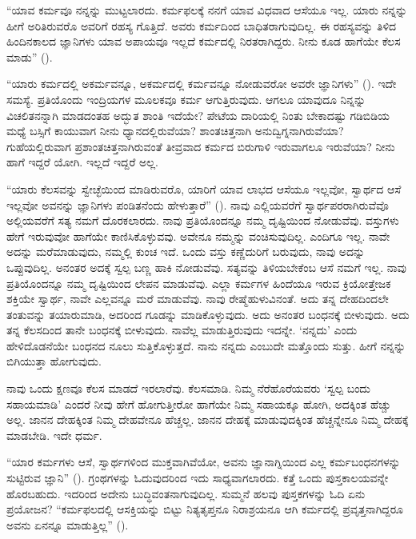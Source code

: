 “ಯಾವ ಕರ್ಮವೂ ನನ್ನನ್ನು ಮುಟ್ಟಲಾರದು. ಕರ್ಮಫಲಕ್ಕೆ ನನಗೆ ಯಾವ ವಿಧವಾದ ಆಸೆಯೂ ಇಲ್ಲ. ಯಾರು ನನ್ನನ್ನು ಹೀಗೆ ಅರಿತಿರುವರೊ ಅವರಿಗೆ ರಹಸ್ಯ ಗೊತ್ತಿದೆ. ಅವರು ಕರ್ಮದಿಂದ ಬಾಧಿತರಾಗುವುದಿಲ್ಲ. ಈ ರಹಸ್ಯವನ್ನು ತಿಳಿದ ಹಿಂದಿನಕಾಲದ ಜ್ಞಾನಿಗಳು ಯಾವ ಅಪಾಯವೂ ಇಲ್ಲದೆ ಕರ್ಮದಲ್ಲಿ ನಿರತರಾಗಿದ್ದರು. ನೀನು ಕೂಡ ಹಾಗೆಯೇ ಕೆಲಸ ಮಾಡು” ().

“ಯಾರು ಕರ್ಮದಲ್ಲಿ ಅಕರ್ಮವನ್ನೂ, ಅಕರ್ಮದಲ್ಲಿ ಕರ್ಮವನ್ನೂ ನೋಡುವರೋ ಅವರೇ ಜ್ಞಾನಿಗಳು” (). ಇದೇ ಸಮಸ್ಯೆ. ಪ್ರತಿಯೊಂದು ಇಂದ್ರಿಯಗಳ ಮೂಲಕವೂ ಕರ್ಮ ಆಗುತ್ತಿರುವುದು. ಆಗಲೂ ಯಾವುದೂ ನಿನ್ನನ್ನು ವಿಚಲಿತನನ್ನಾಗಿ ಮಾಡದಂತಹ ಅದ್ಭುತ ಶಾಂತಿ ಇದೆಯೇ? ಪೇಟೆಯ ದಾರಿಯಲ್ಲಿ ನಿಂತು ಬೇಕಾದಷ್ಟು ಗಡಿಬಿಡಿಯ ಮಧ್ಯೆ ಬಸ್ಸಿಗೆ ಕಾಯುವಾಗ ನೀನು ಧ್ಯಾನದಲ್ಲಿರುವೆಯಾ? ಶಾಂತಚಿತ್ತನಾಗಿ ಅನುದ್ವಿಗ್ನನಾಗಿರುವೆಯಾ? ಗುಹೆಯಲ್ಲಿರುವಾಗ ಪ್ರಶಾಂತಚಿತ್ತನಾಗಿರುವಂತೆ ತೀವ್ರವಾದ ಕರ್ಮದ ಬಿರುಗಾಳಿ ಇರುವಾಗಲೂ ಇರುವೆಯಾ? ನೀನು ಹಾಗೆ ಇದ್ದರೆ ಯೋಗಿ. ಇಲ್ಲದೆ ಇದ್ದರೆ ಅಲ್ಲ.

“ಯಾರು ಕೆಲಸವನ್ನು ಸ್ವೇಚ್ಛೆಯಿಂದ ಮಾಡಿರುವರೊ, ಯಾರಿಗೆ ಯಾವ ಲಾಭದ ಆಸೆಯೂ ಇಲ್ಲವೋ, ಸ್ವಾರ್ಥದ ಆಸೆ ಇಲ್ಲವೋ ಅವನನ್ನು ಜ್ಞಾನಿಗಳು ಪಂಡಿತನೆಂದು ಹೇಳುತ್ತಾರೆ” (). ನಾವು ಎಲ್ಲಿಯವರೆಗೆ ಸ್ವಾರ್ಥಪರರಾಗಿರುವೆವೊ ಅಲ್ಲಿಯವರೆಗೆ ಸತ್ಯ ನಮಗೆ ದೊರಕಲಾರದು. ನಾವು ಪ್ರತಿಯೊಂದನ್ನೂ ನಮ್ಮ ದೃಷ್ಟಿಯಿಂದ ನೋಡುವೆವು. ವಸ್ತುಗಳು ಹೇಗೆ ಇರುವುವೋ ಹಾಗೆಯೇ ಕಾಣಿಸಿಕೊಳ್ಳುವವು. ಅವೇನೂ ನಮ್ಮನ್ನು ವಂಚಿಸುವುದಿಲ್ಲ. ಎಂದಿಗೂ ಇಲ್ಲ. ನಾವೇ ಅದನ್ನು ಮರೆಮಾಡುವುದು, ನಮ್ಮಲ್ಲಿ ಕುಂಚ ಇದೆ. ಒಂದು ವಸ್ತು ಕಣ್ಣೆದುರಿಗೆ ಬರುವುದು, ನಾವು ಅದನ್ನು ಒಪ್ಪುವುದಿಲ್ಲ. ಅನಂತರ ಅದಕ್ಕೆ ಸ್ವಲ್ಪ ಬಣ್ಣ ಹಾಕಿ ನೋಡುವೆವು. ಸತ್ಯವನ್ನು ತಿಳಿಯಬೇಕೆಂಬ ಆಸೆ ನಮಗೆ ಇಲ್ಲ. ನಾವು ಪ್ರತಿಯೊಂದನ್ನೂ ನಮ್ಮ ದೃಷ್ಟಿಯಿಂದ ಲೇಪನ ಮಾಡುವೆವು. ಎಲ್ಲಾ ಕರ್ಮಗಳ ಹಿಂದೆಯೂ ಇರುವ ಕ್ರಿಯೋತ್ತೇಜಕ ಶಕ್ತಿಯೇ ಸ್ವಾರ್ಥ, ನಾವೇ ಎಲ್ಲವನ್ನೂ ಮರೆ ಮಾಡುವೆವು. ನಾವು ರೇಷ್ಮೆಹುಳುವಿನಂತೆ. ಅದು ತನ್ನ ದೇಹದಿಂದಲೇ ತಂತುವನ್ನು ತಯಾರುಮಾಡಿ, ಅದರಿಂದ ಗೂಡನ್ನು ಮಾಡಿಕೊಳ್ಳುವುದು. ಅದು ಅನಂತರ ಬಂಧನಕ್ಕೆ ಬೀಳುವುದು. ಅದು ತನ್ನ ಕೆಲಸದಿಂದ ತಾನೇ ಬಂಧನಕ್ಕೆ ಬೀಳುವುದು. ನಾವೆಲ್ಲ ಮಾಡುತ್ತಿರುವುದು ಇದನ್ನೇ. ‘ನನ್ನದು’ ಎಂದು ಹೇಳಿದೊಡನೆಯೇ ಬಂಧನದ ನೂಲು ಸುತ್ತಿಕೊಳ್ಳುತ್ತದೆ. ನಾನು ನನ್ನದು ಎಂಬುದೇ ಮತ್ತೊಂದು ಸುತ್ತು. ಹೀಗೆ ನನ್ನನ್ನು ಬಿಗಿಯುತ್ತಾ ಹೋಗುವುದು.

ನಾವು ಒಂದು ಕ್ಷಣವೂ ಕೆಲಸ ಮಾಡದೆ ಇರಲಾರೆವು. ಕೆಲಸಮಾಡಿ. ನಿಮ್ಮ ನೆರೆಹೊರೆಯವರು ‘ಸ್ವಲ್ಪ ಬಂದು ಸಹಾಯಮಾಡಿ’ ಎಂದರೆ ನೀವು ಹೇಗೆ ಹೋಗುತ್ತೀರೋ ಹಾಗೆಯೇ ನಿಮ್ಮ ಸಹಾಯಕ್ಕೂ ಹೋಗಿ, ಅದಕ್ಕಿಂತ ಹೆಚ್ಚು ಅಲ್ಲ. ಜಾನನ ದೇಹಕ್ಕಿಂತ ನಿಮ್ಮ ದೇಹವೇನೂ ಹೆಚ್ಚಲ್ಲ. ಜಾನನ ದೇಹಕ್ಕೆ ಮಾಡುವುದಕ್ಕಿಂತ ಹೆಚ್ಚನ್ನೇನೂ ನಿಮ್ಮ ದೇಹಕ್ಕೆ ಮಾಡಬೇಡಿ. ಇದೇ ಧರ್ಮ.

“ಯಾರ ಕರ್ಮಗಳು ಆಸೆ, ಸ್ವಾರ್ಥಗಳಿಂದ ಮುಕ್ತವಾಗಿವೆಯೋ, ಅವನು ಜ್ಞಾನಾಗ್ನಿಯಿಂದ ಎಲ್ಲ ಕರ್ಮಬಂಧನಗಳನ್ನು ಸುಟ್ಟಿರುವ ಜ್ಞಾನಿ” (). ಗ್ರಂಥಗಳನ್ನು ಓದುವುದರಿಂದ ಇದು ಸಾಧ್ಯವಾಗಲಾರದು. ಕತ್ತೆ ಒಂದು ಪುಸ್ತಕಾಲಯವನ್ನೇ ಹೊರಬಹುದು. ಇದರಿಂದ ಅದೇನು ಬುದ್ಧಿವಂತನಾಗುವುದಿಲ್ಲ. ಸುಮ್ಮನೆ ಹಲವು ಪುಸ್ತಕಗಳನ್ನು ಓದಿ ಏನು ಪ್ರಯೋಜನ? “ಕರ್ಮಫಲದಲ್ಲಿ ಆಸಕ್ತಿಯನ್ನು ಬಿಟ್ಟು ನಿತ್ಯತೃಪ್ತನೂ ನಿರಾಶ್ರಯನೂ ಆಗಿ ಕರ್ಮದಲ್ಲಿ ಪ್ರವೃತ್ತನಾಗಿದ್ದರೂ ಅವನು ಏನನ್ನೂ ಮಾಡುತ್ತಿಲ್ಲ” ().

